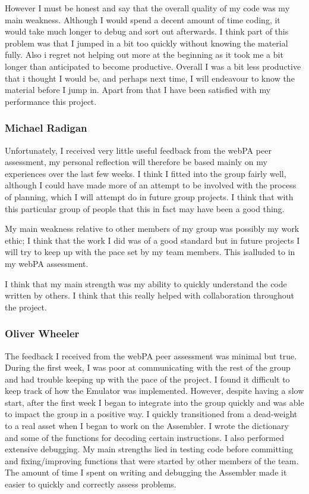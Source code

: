\documentclass[11pt]{article}
\begin{document}
However I must be honest and say that the overall quality of my code was my main weakness. Although I would spend a decent amount of time coding, it would take much longer to debug and sort out afterwards. I think part of this problem was that I jumped in a bit too quickly without knowing the material fully. Also i regret not helping out more at the beginning as it took me a bit longer than anticipated to become productive. Overall I was a bit less productive that i thought I would be, and perhaps next time, I will endeavour to know the material before I jump in. Apart from that I have been satisfied with my performance this project.


\subsubsection*{Michael Radigan}
Unfortunately, I received very little useful feedback from the webPA peer assessment, my personal reflection will therefore be based mainly on my experiences over the last few weeks. I think I fitted into the group fairly  well, although I could have made more of an attempt to be involved with the process of planning, which I will attempt do in future group projects. I think that with this particular group of people that this in fact may have
been a good thing.

My main weakness relative to other members of my group was possibly my work
ethic; I think that the work I did was of a good standard but in future
projects I will try to keep up with the pace set by my team members. This isalluded to in my webPA assessment.

I think that my main strength was my ability to quickly understand the code written by others. I think that this really helped with collaboration throughout the project.

\subsubsection*{Oliver Wheeler}
The feedback I received from the webPA peer assessment was minimal but true.
During the first week, I was poor at communicating with the rest of the group and had trouble keeping up with the pace of the project. I found it difficult to keep track of how the Emulator was implemented.
However, despite having a slow start, after the first week I began to integrate into the group quickly and was able to impact the group in a positive way. I quickly transitioned from a dead-weight to a real asset when I began to work on the Assembler. I wrote the dictionary and some of the functions for decoding certain instructions. I also performed extensive debugging. My main strengths lied in testing code before committing and fixing/improving functions that were started by other members of the team. The amount of time I spent on writing and debugging the Assembler made it easier to quickly and correctly assess problems. 
\end{document}
